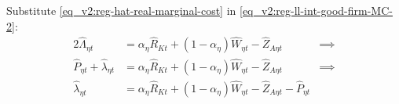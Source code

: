 \documentclass[../thesis.tex]{subfiles}
\begin{document}
Substitute \ref{eq_v2:reg-hat-real-marginal-cost} in \ref{eq_v2:reg-ll-int-good-firm-MC-2}:
\begin{alignat}{2}
	\hat{\Lambda}_{\eta t} &= {\alpha_{\eta}} \hat{R}_{Kt} + (1- {\alpha_{\eta}}) \hat{W}_{\eta t} - \hat{Z}_{A\eta t} &\implies \nonumber \\
	\hat{P}_{\eta t} + \hat{\lambda}_{\eta t} &= {\alpha_{\eta}} \hat{R}_{Kt} + (1- {\alpha_{\eta}}) \hat{W}_{\eta t} - \hat{Z}_{A\eta t} &\implies \nonumber \\
	\hat{\lambda}_{\eta t} &= {\alpha_{\eta}} \hat{R}_{Kt} + (1- {\alpha_{\eta}}) \hat{W}_{\eta t} - \hat{Z}_{A\eta t} - \hat{P}_{\eta t} \label{eq_v2:reg-ll-int-good-firm-MC-3}
\end{alignat}

\begin{comment}

\subsubsection*{Marginal Cost}

Log-linearize \ref{eq_v2:reg-int-good-firm-MC-2}:
\begin{alignat}{2}
	& \Lambda_{\eta t} = Z_{A\eta t}^{-1} \frac{R_{Kt}^{{\alpha_{\eta}}} W_{\eta t}^{1-\alpha_{\eta}}}{{\alpha_{\eta}}^{{\alpha_{\eta}}} (1-\alpha_{\eta})^{1-\alpha_{\eta}}} \implies \tag{\ref{eq_v2:reg-int-good-firm-MC-2}} \\
	& \Lambda (1+ \hat{\Lambda}_{\eta t}) = \nonumber \\ & \qquad = \frac{1}{Z_{A\eta}} \left( \frac{R_{K}}{{\alpha_{\eta}}} \right)^{{\alpha_{\eta}}} \left( \frac{W}{1-\alpha_{\eta}} \right)^{1-\alpha_{\eta}} (1- \hat{Z}_{A\eta t} + {\alpha_{\eta}} \hat{R}_{Kt} + (1- {\alpha_{\eta}}) \hat{W}_{\eta t} ) \implies \nonumber \\
	& \hat{\Lambda}_{\eta t} = {\alpha_{\eta}} \hat{R}_{Kt} + (1- {\alpha_{\eta}}) \hat{W}_{\eta t} - \hat{Z}_{A\eta t} \label{eq_v2:reg-ll-int-good-firm-MC-2}
\end{alignat}
	
\end{comment}




\begin{comment}
	
	Log-linearize \ref{eq_v2:reg-int-good-firm-prod-function} and then substitute \ref{eq_v2:reg-hat-real-marginal-cost}:
	\begin{align}
		\Lambda_{\eta t} &= \frac{W_{\eta t}}{Z_{A\eta t}} \tag{\ref{eq_v2:reg-int-good-firm-prod-function}} \implies \\
		\hat{\Lambda}_{\eta t} &= \hat{W}_{\eta t} - \hat{Z}_{A\eta t} \implies \nonumber \\
		\hat{P}_{\eta t} + \hat{\lambda}_{\eta t} &= \hat{W}_{\eta t} - \hat{Z}_{A\eta t} \label{eq_v2:reg-int-good-firm-FOC-Lt-ll}
	\end{align}
	
\end{comment}
\end{document}
